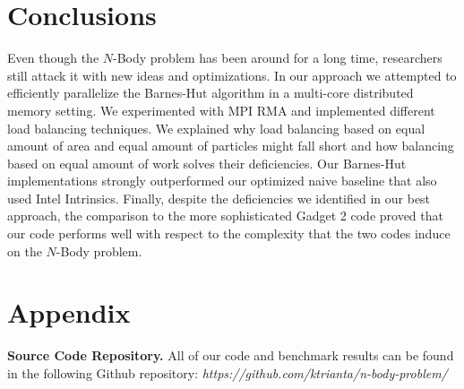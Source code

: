 \documentclass[letterpaper]{article}
\newcommand{\mypar}[1]{{\bf #1.}}
\begin{document}
\section{Conclusions}

Even though the $N$-Body problem has been around for a long time, researchers still attack it with new ideas and optimizations. In our approach we attempted to efficiently parallelize the Barnes-Hut algorithm in a multi-core distributed memory setting. We experimented with MPI RMA and implemented different load balancing techniques. We explained why load balancing based on equal amount of area and equal amount of particles might fall short and how balancing based on equal amount of work solves their deficiencies. Our Barnes-Hut implementations strongly outperformed our optimized naive baseline that also used Intel Intrinsics. Finally, despite the deficiencies we identified in our best approach, the comparison to the more sophisticated Gadget 2 code proved that our code performs well with respect to the complexity that the two codes induce on the $N$-Body problem.




\section{Appendix}

\mypar{Source Code Repository}
All of our code and benchmark results can be found in the following Github repository:
\textit{https://github.com/ktrianta/n-body-problem/}
\end{document}

